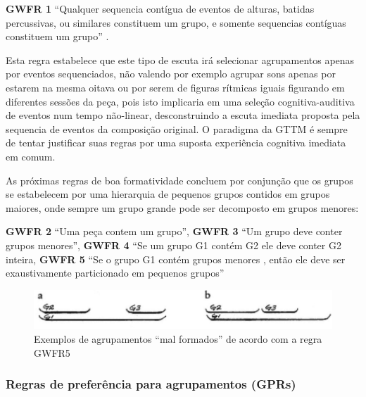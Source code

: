 \documentclass[
	12pt,				%
	openright,			%
	twoside,			%
	a4paper,			%
	english,			%
	french,				%
	spanish,			%
	brazil				%
	]{abntex2}
\begin{document}
\begin{citacao}
\textbf{GWFR 1} “Qualquer sequencia contígua de eventos de alturas, batidas percussivas, ou similares constituem um grupo, e somente sequencias contíguas constituem um grupo” \cite[ pg.37]{lerdahl1983generative}.
\end{citacao}

Esta regra estabelece que este tipo de escuta irá selecionar agrupamentos apenas por eventos sequenciados, não valendo por exemplo agrupar sons apenas por estarem na mesma oitava ou por serem de figuras rítmicas iguais figurando em diferentes sessões da peça, pois isto implicaria em uma seleção cognitiva-auditiva de eventos num tempo não-linear, desconstruindo a escuta imediata proposta pela sequencia de eventos da composição original. O paradigma da GTTM é sempre de tentar justificar suas regras por uma suposta experiência cognitiva imediata em comum.

As próximas regras de boa formatividade concluem por conjunção que os grupos se estabelecem por uma hierarquia de pequenos grupos contidos em grupos maiores, onde sempre um grupo grande pode ser decomposto em grupos menores:


\begin{citacao}
\textbf{GWFR 2} “Uma peça contem um grupo”, \textbf{GWFR 3} “Um grupo deve conter grupos menores”, \textbf{GWFR 4}  “Se um grupo G1 contém G2 ele deve conter G2 inteira, \textbf{GWFR 5} “Se o grupo G1 contém grupos menores , então ele deve ser exaustivamente particionado em pequenos grupos” 
 \cite[ p.38]{lerdahl1983generative}
\end{citacao}

\pagebreak
\begin{figure}[htb]
	\caption{\label{fig_grafico}Exemplos de agrupamentos “mal formados” de acordo com a regra GWFR5}
	\begin{center}
	    \includegraphics[scale=0.35]{gttm/GWFR_fig33.png}
	\end{center}
\end{figure}


\subsubsection{Regras de preferência para agrupamentos (GPRs)}
\end{document}

